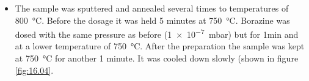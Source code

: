 \begin{itemize}
 \item The sample was sputtered and annealed several times to temperatures of \SI{800}{\degreeCelsius}. Before the dosage it was held 5 minutes at \SI{750}{\degreeCelsius}. Borazine was dosed with the same pressure as before (\SI{1e-7}{\milli \bar}) but for 1min and at a lower temperature of \SI{750}{\degreeCelsius}. After the preparation the sample was kept at \SI{750}{\degreeCelsius} for another 1 minute. It was cooled down slowly (shown in figure \ref{fig:16.04}.
\end{itemize}

